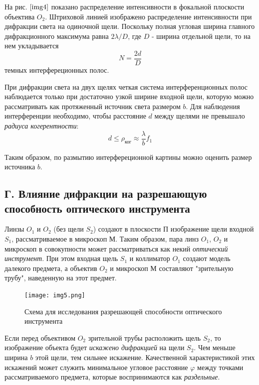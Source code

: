 \documentclass[a4paper,12pt]{article}
\begin{document}
На рис. $\ref{img4}$ показано распределение интенсивности в фокальной плоскости объектива $O_2$. Штриховой линией изображено распределение интенсивности при дифракции света на одиночной щели. Поскольку полная угловая ширина главного дифракционного максимума равна $2\lambda/D$, где $D$ - ширина отдельной щели, то на нем укладывается
\begin{equation}
    N = \frac{2d}{D}
\end{equation}
темных интерфереционных полос.

При дифракции света на двух щелях четкая система интерференционных полос наблюдается только при достаточно узкой ширине входной щели, которую можно рассматривать как протяженный источник света размером $b$. Для наблюдения интерференции необходимо, чтобы расстояние $d$ между щелями не превышало \textit{радиуса когерентности}:
\begin{equation}
    d \leq \rho_\text{ког} \approx \frac{\lambda}{b}f_1
\end{equation}

Таким образом, по размытию интерфереционной картины можно оценить размер источника $b$.

\subsection{Г. Влияние дифракции на разрешающую способность оптического инструмента}

Линзы $O_1$ и $O_2$ (без щели $S_2$) создают в плоскости П изображение щели входной $S_1$, рассматриваемое в микроскоп М. Таким образом, пара линз $O_1$, $O_2$ и микроскоп в совокупности может рассматриваться как некий \textit{оптический инструмент}. При этом входная щель $S_1$ и коллиматор $O_1$ создают модель далекого предмета, а объектив $O_2$ и микроскоп М составляют "зрительную трубу", наведенную на этот предмет.

\begin{figure}[h]
\centering
\texttt{[image: img5.png]}
\caption{Схема для исследования разрешающей способности оптического инструмента}
\label{img5}
\end{figure}

Если перед объективом $O_2$ зрительной трубы расположить щель $S_2$, то изображение объекта будет \textit{искажено дифракцией} на щели $S_2$. Чем меньше ширина $b$ этой щели, тем сильнее искажение. Качественной характеристикой этих искажений может служить минимальное угловое расстояние $\varphi$ между точками рассматриваемого предмета, которые воспринимаются как \textit{раздельные}.
\end{document}
